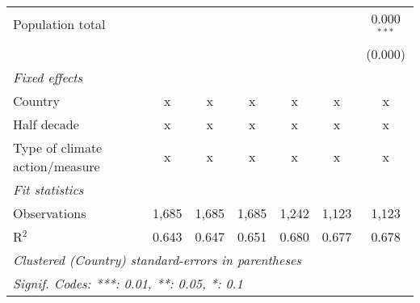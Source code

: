\begin{tabular}{lcccccc}
   Population total                                                        &         &                &                &                &                & 0.000$^{***}$\\   
                                                                           &         &                &                &                &                & (0.000)\\   
   \emph{Fixed effects}\\
   Country                                                                 & x       & x              & x              & x              & x              & x\\  
   Half decade                                                             & x       & x              & x              & x              & x              & x\\  
   Type of climate action/measure                                          & x       & x              & x              & x              & x              & x\\  
   \midrule \emph{Fit statistics}\\
   Observations                                                            & 1,685   & 1,685          & 1,685          & 1,242          & 1,123          & 1,123\\  
   R$^2$                                                                   & 0.643   & 0.647          & 0.651          & 0.680          & 0.677          & 0.678\\  
   \midrule
   \multicolumn{7}{l}{\emph{Clustered (Country) standard-errors in parentheses}}\\
   \multicolumn{7}{l}{\emph{Signif. Codes: ***: 0.01, **: 0.05, *: 0.1}}\\
\end{tabular}
\par\endgroup


